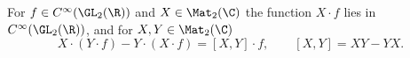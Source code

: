 For $f\in C^\infty(\GL_2(\R))$ and $X\in\Mat_2(\C)$ the function $X\cdot f$ lies in $C^\infty(\GL_2(\R))$, and
for $X,Y\in\Mat_2(\C)$
\[
  X\cdot(Y\cdot f)-Y\cdot(X\cdot f)=[X,Y]\cdot f,\qquad [X,Y]=XY-YX.
\]
